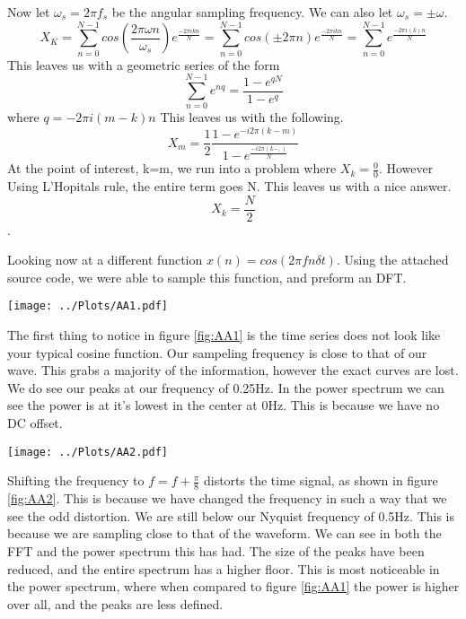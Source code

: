 \documentclass[twocolumn]{myarticle}
\begin{document}
Now let $\omega_{s}=2\pi f_{s}$ be the angular sampling frequency. We can also let $\omega_{s} = \pm \omega$.
\begin{equation*}
X_{K}=\sum^{N-1}_{n=0}cos(\frac{2\pi \omega n}{\omega_{s}})e^{\frac{-2\pi ikn}{N}}=\sum^{N-1}_{n=0}cos(\pm 2\pi n)e^{\frac{-2\pi ikn}{N}} = \sum^{N-1}_{n=0}e^{\frac{-2\pi i(k)n}{N}}
\end{equation*}
This leaves us with a geometric series of the form 
\begin{equation*}
\sum_{n=0}^{N-1}e^{nq} = \frac{1-e^{qN}}{1-e^{q}}
\end{equation*}
where $q=-2\pi i(m-k)n$ This leaves us with the following.
\begin{equation*}
X_{m} = \frac{1}{2} \frac{1-e^{-i2\pi (k-m)}}{1-e^{\frac{-i2\pi (k-,)}{N}}}
\end{equation*}
At the point of interest, k=m, we run into a problem where $X_{k}=\frac{0}{0}$. However Using L'Hopitals rule, the entire term goes N. This leaves us with a nice answer.
\begin{equation*}
X_{k}=\frac{N}{2}
\end{equation*}.

Looking now at a different function $x(n)=cos(2\pi f n\delta t)$. Using the attached source code, we were able to sample this function, and preform an DFT.

\begin{figure*}[htpb]
    \centering
    \texttt{[image: ../Plots/AA1.pdf]}
    \caption{%
        DFT of $x(n)=cos(2\pi fn\delta t)$. Top figure showing the sampled time series, the middle showing the DFT, and the bottom displaying the power in dB.
    }
    \label{fig:AA1}
\end{figure*}

The first thing to notice in figure \ref{fig:AA1} is the time series does not look like your typical cosine function. Our sampeling frequency is close to that of our wave. This grabs a majority of the information, however the exact curves are lost. We do see our peaks at our frequency of 0.25Hz. In the power spectrum we can see the power is at it's lowest in the center at 0Hz. This is because we have no DC offset. 

\begin{figure*}[htpb]
    \centering
    \texttt{[image: ../Plots/AA2.pdf]}
    \caption{%
        DFT of the modified cosine of $x(n)=cos(2\pi (f+0.008) + n\delta t)$. Top figure showing the sampled time series, the middle showing the DFT, and the bottom displaying the power in dB.
    }
    \label{fig:AA2}
\end{figure*}
Shifting the frequency to $f=f+\frac{\pi}{8}$ distorts the time signal, as shown in figure \ref{fig:AA2}. This is because we have changed the frequency in such a way that we see the odd distortion. We are still below our Nyquist frequency of 0.5Hz. This is because we are sampling close to that of the waveform. We can see in both the FFT and the power spectrum this has had. The size of the peaks have been reduced, and the entire spectrum has a higher floor. This is most noticeable in the power spectrum, where when compared to figure \ref{fig:AA1} the power is higher over all, and the peaks are less defined.   
\end{document}
